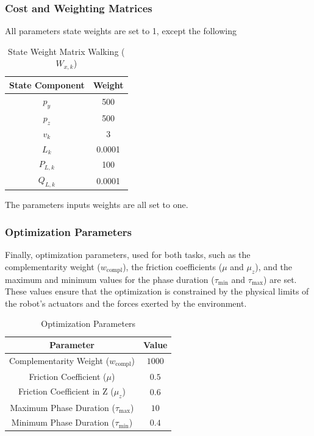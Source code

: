 \documentclass[main.tex]{subfiles}
\begin{document}
\subsubsection*{Cost and Weighting Matrices}
All parameters state weights are set to 1, except the following
\begin{table}[H]
\centering
\renewcommand{\arraystretch}{1.5} %
\begin{tabular}{|c|c|}
\hline
\textbf{State Component} & \textbf{Weight} \\ \hline
\(p_y\) & 500 \\ \hline
\(p_z\) & 500 \\ \hline
\(v_k\) & 3 \\ \hline
\(L_k\) & 0.0001 \\ \hline
\(P_{L,k}\) & 100 \\ \hline
\(Q_{L,k}\) & 0.0001 \\ \hline
\end{tabular}
\caption{State Weight Matrix Walking (\(W_{x,k}\))}
\label{tab:state_weights_walk}
\end{table}


The parameters inputs weights are all set to one.

\subsubsection*{Optimization Parameters}

Finally, optimization parameters, used for both tasks, such as the complementarity weight (\(w_{\text{compl}}\)), the friction coefficients (\(\mu\) and \(\mu_z\)), and the maximum and minimum values for the phase duration (\(\tau_{\text{min}}\) and \(\tau_{\text{max}}\)) are set. These values ensure that the optimization is constrained by the physical limits of the robot’s actuators and the forces exerted by the environment.

\begin{table}[H]
\centering
\renewcommand{\arraystretch}{1.5} %
\begin{tabular}{|c|c|}
\hline
\textbf{Parameter} & \textbf{Value} \\ \hline
Complementarity Weight (\(w_{\text{compl}}\)) & \(1000\) \\ \hline
Friction Coefficient (\(\mu\)) & \(0.5\) \\ \hline
Friction Coefficient in Z (\(\mu_z\)) & \(0.6\) \\ \hline
Maximum Phase Duration (\(\tau_{\text{max}}\)) & \(10\) \\ \hline
Minimum Phase Duration (\(\tau_{\text{min}}\)) & \(0.4\) \\ \hline
\end{tabular}
\caption{Optimization Parameters}
\label{tab:optimization_params}
\end{table}
\end{document}
